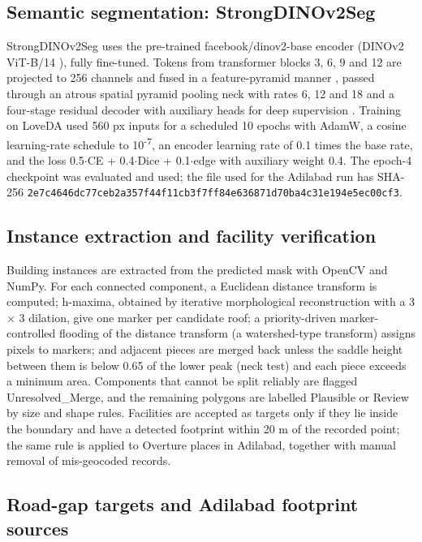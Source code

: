 \documentclass[journal]{IEEEtran}
\begin{document}
\subsection{Semantic segmentation: StrongDINOv2Seg}

StrongDINOv2Seg uses the pre-trained facebook/dinov2-base encoder (DINOv2 ViT-B/14 \cite{oquab2023dinov2}), fully fine-tuned. Tokens from transformer blocks 3, 6, 9 and 12 are projected to 256 channels and fused in a feature-pyramid manner \cite{lin2017fpn}, passed through an atrous spatial pyramid pooling neck with rates 6, 12 and 18 \cite{chen2018deeplabv3plus} and a four-stage residual decoder with auxiliary heads for deep supervision \cite{lee2015dsn}. Training on LoveDA \cite{wang2021loveda} used 560 px inputs for a scheduled 10 epochs with AdamW, a cosine learning-rate schedule to 10\textsuperscript{-7}, an encoder learning rate of 0.1 times the base rate, and the loss 0.5$\cdot$CE + 0.4$\cdot$Dice + 0.1$\cdot$edge \cite{milletari2016vnet} with auxiliary weight 0.4. The epoch-4 checkpoint was evaluated and used; the file used for the Adilabad run has SHA-256 \texttt{2e7c4646dc77ceb2\allowbreak a357f44f11cb3f7f\allowbreak f84e636871d70ba4\allowbreak c31e194e5ec00cf3}.

\subsection{Instance extraction and facility verification}

Building instances are extracted from the predicted mask with OpenCV and NumPy. For each connected component, a Euclidean distance transform is computed; h-maxima, obtained by iterative morphological reconstruction with a 3 $\times$ 3 dilation, give one marker per candidate roof; a priority-driven marker-controlled flooding of the distance transform (a watershed-type transform) assigns pixels to markers; and adjacent pieces are merged back unless the saddle height between them is below 0.65 of the lower peak (neck test) and each piece exceeds a minimum area. Components that cannot be split reliably are flagged Unresolved\_Merge, and the remaining polygons are labelled Plausible or Review by size and shape rules. Facilities are accepted as targets only if they lie inside the boundary and have a detected footprint within 20 m of the recorded point; the same rule is applied to Overture places in Adilabad, together with manual removal of mis-geocoded records.

\subsection{Road-gap targets and Adilabad footprint sources}
\end{document}
